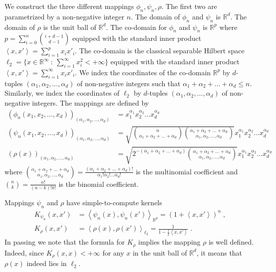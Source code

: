 \documentclass[12pt]{article}
\newcommand{\R}{\mathbb{R}}  %
\newcommand{\ip}[2]{\left\langle #1, #2 \right\rangle} %
\begin{document}
We construct the three different mappings $\phi_n, \psi_n, \rho$. The first two
are parametrized by a non-negative integer $n$. The domain of $\phi_n$ and
$\psi_n$ is $\R^d$. The domain of $\rho$ is the unit ball of $\R^d$. The
co-domain for $\phi_n$ and $\psi_n$ is $\R^p$ where $p = \sum_{i=0}^n
\binom{i+d-1}{d-1}$ equipped with the standard inner product $\ip{x}{x'} =
\sum_{i=1}^p x_i x'_i$. The co-domain is the classical separable Hilbert space
$\ell_2 = \{ x \in \R^\infty ~:~ \sum_{i=1}^\infty x_i^2 < + \infty \}$ equipped
with the standard inner product $\ip{x}{x'} = \sum_{i=1}^\infty x_i x'_i$. We
index the coordinates of the co-domain $\R^p$ by $d$-tuples $(\alpha_1,
\alpha_2, \dots, \alpha_d)$ of non-negative integers such that $\alpha_1 +
\alpha_2 + \dots + \alpha_d \le n$. Similarly, we index the coordinates of
$\ell_2$ by $d$-tuples $(\alpha_1, \alpha_2, \dots, \alpha_d)$ of non-negative
integers. The mappings are defined by
\begin{align*}
\left(\phi_n(x_1, x_2, \dots, x_d)\right)_{(\alpha_1, \alpha_2, \dots, \alpha_d)}
& = x_1^{\alpha_1} x_2^{\alpha_2} \dots x_d^{\alpha_d}
\\
\left(\psi_n(x_1, x_2, \dots, x_d)\right)_{(\alpha_1, \alpha_2, \dots, \alpha_d)}
& = \sqrt{\binom{n}{\alpha_1 + \alpha_2 + \dots + \alpha_d} \binom{\alpha_1 + \alpha_2 + \dots + \alpha_d}{\alpha_1, \alpha_2, \dots, \alpha_d}} x_1^{\alpha_1} x_2^{\alpha_2} \dots x_d^{\alpha_d}
\\
\left(\rho(x)\right)_{(\alpha_1, \alpha_2, \dots, \alpha_d)}
& = \sqrt{2^{-(\alpha_1 + \alpha_2 + \dots + \alpha_d)} \binom{\alpha_1 + \alpha_2 + \dots + \alpha_d}{\alpha_1, \alpha_2, \dots, \alpha_d}} x_1^{\alpha_1} x_2^{\alpha_2} \dots x_d^{\alpha_d}
\end{align*}
where $\binom{\alpha_1 + \alpha_2 + \dots + \alpha_d}{\alpha_1, \alpha_2, \dots, \alpha_d} = \frac{(\alpha_1 + \alpha_2 + \dots + \alpha_d)!}{\alpha_1! \alpha_2! \dots \alpha_d!}$
is the multinomial coefficient and $\binom{n}{k} = \frac{n!}{(n-k)!k!}$ is the binomial coefficient.

Mappings $\psi_n$ and $\rho$ have simple-to-compute kernels
\begin{align*}
K_{\psi_n}(x,x') & = \ip{\psi_n(x)}{\psi_n(x')}_{\R^p} = \left( 1 + \ip{x}{x'} \right)^n \; , \\
K_{\rho}(x,x') & = \ip{\rho(x)}{\rho(x')}_{\ell_2} = \frac{1}{1 - \frac{1}{2}\ip{x}{x'}} \; .
\end{align*}
In passing we note that the formula for $K_\rho$ implies the mapping $\rho$ is
well defined. Indeed, since $K_{\rho}(x,x) < +\infty$ for any $x$ in the unit
ball of $\R^d$, it means that $\rho(x)$ indeed lies in $\ell_2$.
\end{document}
